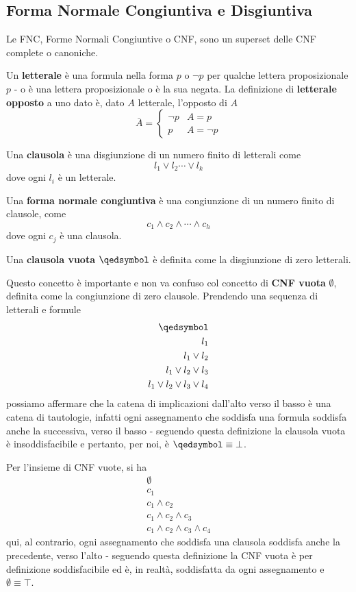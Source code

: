 \subsection{Forma Normale Congiuntiva e Disgiuntiva}
Le FNC, Forme Normali Congiuntive o CNF, sono un superset delle CNF complete o canoniche.
\begin{defi}[Letterale]
Un \textbf{letterale} è una formula nella forma $p$ o $\neg p$ per qualche 
lettera proposizionale $p$ - o è una lettera proposizionale o è la sua negata. 
La definizione di \textbf{letterale opposto} a uno dato è, dato $A$ letterale, 
l'opposto di $A$
$$
\bar{A} = 
\begin{cases}
  \neg p & A = p \\
  p & A = \neg p
\end{cases}
$$
\end{defi}
\begin{defi}[Clausola]
Una \textbf{clausola} è una disgiunzione di un numero finito di letterali come 
$$
l_1 \lor l_2 \cdots \lor l_k
$$
dove ogni $l_i$ è un letterale. 
\end{defi}
\begin{defi}[FNC]
Una \textbf{forma normale congiuntiva} è una congiunzione di un numero finito di 
clausole, come 
$$
c_1 \land c_2 \land \cdots \land c_h
$$
dove ogni $c_j$ è una clausola. 
\end{defi}
\begin{defi}
Una \textbf{clausola vuota} $\qedsymbol$ è definita come la disgiunzione 
di zero letterali. 
\end{defi}

Questo concetto è importante e non va confuso col concetto 
di \textbf{CNF vuota} $\emptyset$, definita come la congiunzione di zero clausole. 
Prendendo una sequenza di letterali e formule
\begin{align*}
\qedsymbol \\
l_1 \\
l_1 \lor l_2 \\
l_1 \lor l_2 \lor l_3 \\
l_1 \lor l_2 \lor l_3 \lor l_4
\end{align*}
possiamo affermare che la catena di implicazioni dall'alto verso il basso 
è una catena di tautologie, infatti
ogni assegnamento che soddisfa una formula soddisfa anche la successiva, verso 
il basso - seguendo questa definizione la clausola vuota è insoddisfacibile e 
pertanto, per noi, è $\qedsymbol \equiv \bot$.

Per l'insieme di CNF vuote, si ha 
\begin{align*}
\emptyset \\
c_1 \\
c_1 \land c_2 \\
c_1 \land c_2 \land c_3\\
c_1 \land c_2 \land c_3 \land c_4
\end{align*}
qui, al contrario, ogni assegnamento che soddisfa una clausola soddisfa anche la 
precedente, verso l'alto - seguendo questa definizione la CNF vuota è per 
definizione soddisfacibile ed è, in realtà, soddisfatta da ogni assegnamento 
e $\emptyset \equiv \top$. 

